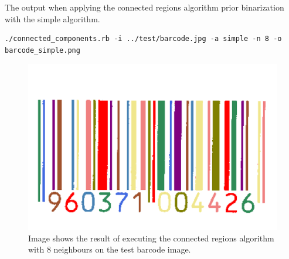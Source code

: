 \documentclass[a4paper,10pt,titlepage]{article}
\begin{document}
\par The output when applying the connected regions algorithm prior binarization with the simple algorithm. 
{\footnotesize\begin{verbatim}
./connected_components.rb -i ../test/barcode.jpg -a simple -n 8 -o barcode_simple.png
\end{verbatim}}
\par \begin{figure}[H]
	\centerline{%
	\includegraphics[scale=0.3]{./images/barcode_simple.png}
	}
	\caption[Connected regions execution barcode image]{Image shows the result of executing the connected regions algorithm with 8 neighbours on the test barcode image.}
\end{figure}
\end{document}
